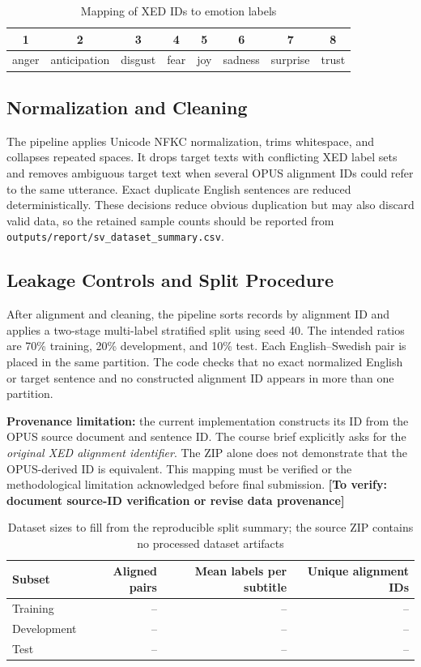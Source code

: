 \documentclass[11pt,a4paper]{article}
\newcommand{\todo}[1]{\textcolor{red!65!black}{\textbf{[To verify: #1]}}}
\begin{document}
\begin{table}[H]
\centering
\caption{Mapping of XED IDs to emotion labels}
\begin{tabular}{cccccccc}
\toprule
1 & 2 & 3 & 4 & 5 & 6 & 7 & 8 \\
\midrule
anger & anticipation & disgust & fear & joy & sadness & surprise & trust \\
\bottomrule
\end{tabular}
\end{table}

\subsection{Normalization and Cleaning}
The pipeline applies Unicode NFKC normalization, trims whitespace, and collapses repeated spaces. It drops target texts with conflicting XED label sets and removes ambiguous target text when several OPUS alignment IDs could refer to the same utterance. Exact duplicate English sentences are reduced deterministically. These decisions reduce obvious duplication but may also discard valid data, so the retained sample counts should be reported from \texttt{outputs/report/sv\_dataset\_summary.csv}.

\subsection{Leakage Controls and Split Procedure}
After alignment and cleaning, the pipeline sorts records by alignment ID and applies a two-stage multi-label stratified split using seed 40. The intended ratios are 70\% training, 20\% development, and 10\% test. Each English--Swedish pair is placed in the same partition. The code checks that no exact normalized English or target sentence and no constructed alignment ID appears in more than one partition.

\textbf{Provenance limitation:} the current implementation constructs its ID from the OPUS source document and sentence ID. The course brief explicitly asks for the \emph{original XED alignment identifier}. The ZIP alone does not demonstrate that the OPUS-derived ID is equivalent. This mapping must be verified or the methodological limitation acknowledged before final submission. \todo{document source-ID verification or revise data provenance}

\begin{table}[H]
\centering\small
\caption{Dataset sizes to fill from the reproducible split summary; the source ZIP contains no processed dataset artifacts}
\label{tab:split}
\begin{tabular}{lrrr}
\toprule
Subset & Aligned pairs & Mean labels per subtitle & Unique alignment IDs \\
\midrule
Training & -- & -- & -- \\
Development & -- & -- & -- \\
Test & -- & -- & -- \\
\bottomrule
\end{tabular}
\end{table}
\end{document}
